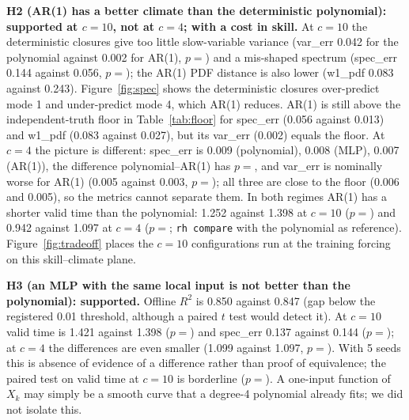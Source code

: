 \textbf{H2 (AR(1) has a better climate than the deterministic polynomial): supported at $c{=}10$, not at $c{=}4$; with a cost in skill.} At $c{=}10$ the deterministic closures give too little slow-variable variance (var\_err 0.042 for the polynomial against 0.002 for AR(1), $p=$) and a mis-shaped spectrum (spec\_err 0.144 against 0.056, $p=$); the AR(1) PDF distance is also lower (w1\_pdf 0.083 against 0.243). Figure~\ref{fig:spec} shows the deterministic closures over-predict mode 1 and under-predict mode 4, which AR(1) reduces. AR(1) is still above the independent-truth floor in Table~\ref{tab:floor} for spec\_err (0.056 against 0.013) and w1\_pdf (0.083 against 0.027), but its var\_err (0.002) equals the floor. At $c{=}4$ the picture is different: spec\_err is 0.009 (polynomial), 0.008 (MLP), 0.007 (AR(1)), the difference polynomial--AR(1) has $p=$, and var\_err is nominally worse for AR(1) (0.005 against 0.003, $p=$); all three are close to the floor (0.006 and 0.005), so the metrics cannot separate them. In both regimes AR(1) has a shorter valid time than the polynomial: 1.252 against 1.398 at $c{=}10$ ($p=$) and 0.942 against 1.097 at $c{=}4$ ($p=$; \texttt{rh compare} with the polynomial as reference). Figure~\ref{fig:tradeoff} places the $c{=}10$ configurations run at the training forcing on this skill--climate plane.

\textbf{H3 (an MLP with the same local input is not better than the polynomial): supported.} Offline $R^2$ is 0.850 against 0.847 (gap below the registered 0.01 threshold, although a paired $t$ test would detect it). At $c{=}10$ valid time is 1.421 against 1.398 ($p=$) and spec\_err 0.137 against 0.144 ($p=$); at $c{=}4$ the differences are even smaller (1.099 against 1.097, $p=$). With 5 seeds this is absence of evidence of a difference rather than proof of equivalence; the paired test on valid time at $c{=}10$ is borderline ($p=$). A one-input function of $X_k$ may simply be a smooth curve that a degree-4 polynomial already fits; we did not isolate this.

